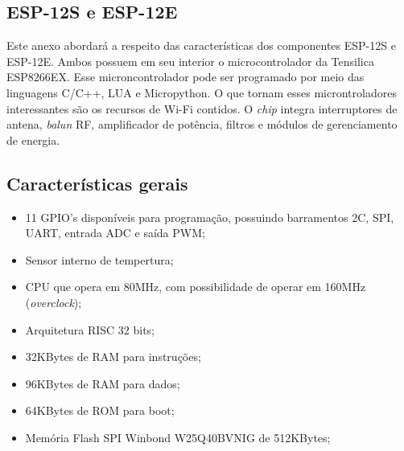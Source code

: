 
\begin{anexosenv}
\partanexos

\chapter{ESP-12S e ESP-12E}     %
\label{chap:anexoA}





Este anexo abordará a respeito das características dos componentes ESP-12S e ESP-12E. Ambos possuem em seu interior o microcontrolador da Tensilica ESP8266EX. Esse microncontrolador pode ser programado por meio das linguagens C/C++, LUA e Micropython\cite{Embarcados}. O que tornam esses microntroladores interessantes são os recursos de Wi-Fi contidos. O \textit{chip} integra interruptores de antena, \textit{balun} RF, amplificador de potência, filtros e módulos de gerenciamento de energia.

\section{Características gerais}

\begin{itemize}
	\item 11 GPIO's disponíveis para programação, possuindo barramentos 2C, SPI, UART, entrada ADC e saída PWM;
	\item Sensor interno de tempertura;
	\item CPU que opera em 80MHz, com possibilidade de operar em 160MHz (\textit{overclock});
	\item Arquitetura RISC 32 bits;
	\item 32KBytes de RAM para instruções;
	\item 96KBytes de RAM para dados;
	\item 64KBytes de ROM para boot;
	\item Memória Flash SPI Winbond W25Q40BVNIG de 512KBytes;
\end{itemize}


\end{anexosenv}
